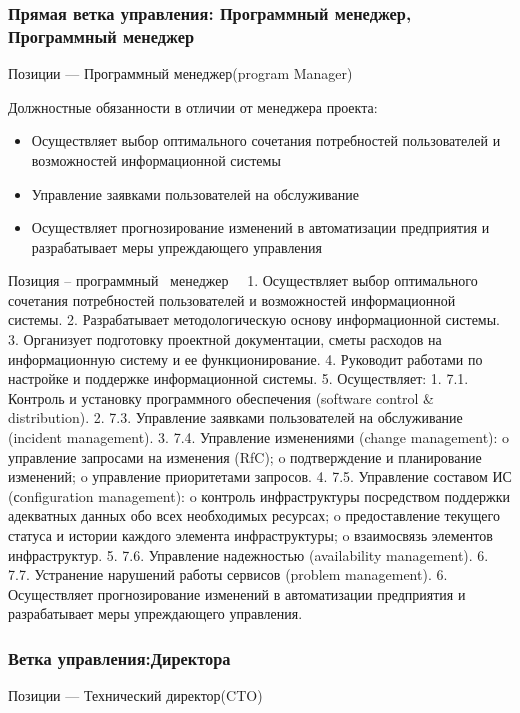\documentclass{../industrial-development}
\begin{document}
{\begin{frame} \frametitle{Прямая ветка управления: Программный менеджер, Программный менеджер}
 \begin{block}{}
  \alert{Позиции --- Программный менеджер(program Manager)}

Должностные обязанности в отличии от менеджера проекта: 
  \end{block}
  \begin{itemize}
  \item Осуществляет выбор оптимального сочетания потребностей пользователей и возможностей информационной системы
 \item Управление заявками пользователей на обслуживание
 \item Осуществляет прогнозирование изменений в автоматизации предприятия и разрабатывает меры упреждающего управления
  \end{itemize}
\end{frame}

\lecturenotes

Позиция – программный~\cite{hh} менеджер~\cite{itcf}~\cite{rab}
1.	Осуществляет выбор оптимального сочетания потребностей пользователей и возможностей информационной системы.
2.	Разрабатывает методологическую основу информационной системы.
3.	Организует подготовку проектной документации, сметы расходов на информационную систему и ее функционирование.
4.	Руководит работами по настройке и поддержке информационной системы.
5.	Осуществляет:
1.	7.1. Контроль и установку программного обеспечения (software control & distribution).
2.	7.3. Управление заявками пользователей на обслуживание (incident management).
3.	7.4. Управление изменениями (change management):
o	управление запросами на изменения (RfC);
o	подтверждение и планирование изменений;
o	управление приоритетами запросов.
4.	7.5. Управление составом ИС (сonfiguration management):
o	контроль инфраструктуры посредством поддержки адекватных данных обо всех необходимых ресурсах;
o	предоставление текущего статуса и истории каждого элемента инфраструктуры;
o	взаимосвязь элементов инфраструктур.
5.	7.6. Управление надежностью (availability management).
6.	7.7. Устранение нарушений работы сервисов (problem management).
6.	Осуществляет прогнозирование изменений в автоматизации предприятия и разрабатывает меры упреждающего управления.


\begin{frame} \frametitle{Ветка управления:Директора}
 \begin{block}{}
  \alert{Позиции --- Технический директор(CTO)}


\end{block}
\end{frame}}
\end{document}

